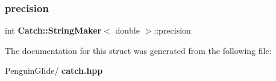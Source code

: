\subsubsection{precision}
{\footnotesize\ttfamily int \textbf{ Catch\+::\+String\+Maker}$<$ double $>$\+::precision\hspace{0.3cm}{\ttfamily [static]}}



The documentation for this struct was generated from the following file\+:\begin{DoxyCompactItemize}
\item 
Penguin\+Glide/\textbf{ catch.\+hpp}\end{DoxyCompactItemize}

